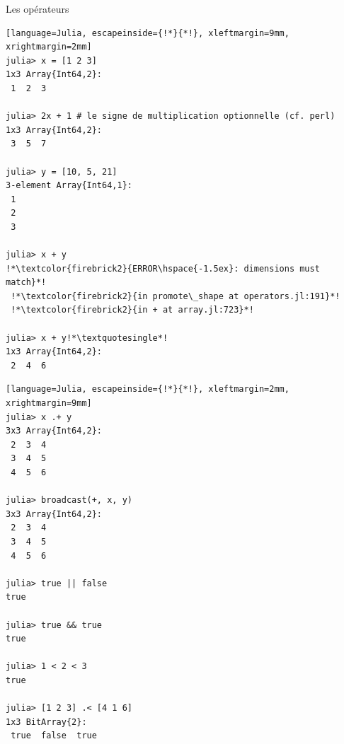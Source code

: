 \begin{frame}[containsverbatim]{Les opérateurs}
\begin{multicols}{2}
\begin{lstlisting}[language=Julia, escapeinside={!*}{*!}, xleftmargin=9mm, xrightmargin=2mm]
julia> x = [1 2 3]
1x3 Array{Int64,2}:
 1  2  3

julia> 2x + 1 # le signe de multiplication optionnelle (cf. perl)
1x3 Array{Int64,2}:
 3  5  7

julia> y = [10, 5, 21]
3-element Array{Int64,1}:
 1
 2
 3

julia> x + y
!*\textcolor{firebrick2}{ERROR\hspace{-1.5ex}: dimensions must match}*!
 !*\textcolor{firebrick2}{in promote\_shape at operators.jl:191}*!
 !*\textcolor{firebrick2}{in + at array.jl:723}*!

julia> x + y!*\textquotesingle*!
1x3 Array{Int64,2}:
 2  4  6
\end{lstlisting}
\columnbreak
\begin{lstlisting}[language=Julia, escapeinside={!*}{*!}, xleftmargin=2mm, xrightmargin=9mm]
julia> x .+ y
3x3 Array{Int64,2}:
 2  3  4
 3  4  5
 4  5  6

julia> broadcast(+, x, y)
3x3 Array{Int64,2}:
 2  3  4
 3  4  5
 4  5  6

julia> true || false
true

julia> true && true
true

julia> 1 < 2 < 3
true

julia> [1 2 3] .< [4 1 6]
1x3 BitArray{2}:
 true  false  true
\end{lstlisting}
\end{multicols}
\end{frame}


